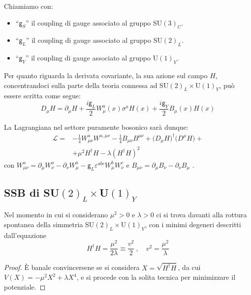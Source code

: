 \documentclass[../main.tex]{subfiles}
\begin{document}
Chiamiamo con:
\begin{itemize}
    \item “$\mathsf g_S$” il coupling di gauge associato al gruppo SU$(3)_C$.
    \item “$\mathsf g_L$” il coupling di gauge associato al gruppo SU$(2)_L$.
    \item “$\mathsf g_Y$” il coupling di gauge associato al gruppo U$(1)_Y$.
\end{itemize}

Per quanto riguarda la derivata covariante, la sua azione sul campo $H$, concentrandoci sulla parte della teoria connessa ad SU$(2)_L\times$U$(1)_Y$, può essere scritta come segue:
\begin{equation}
    \boxed{D_\mu H = \partial_\mu H +\frac{i\mathsf g_L}{2}W_\mu^a(x)\sigma^a H(x) +\frac{i\mathsf g_Y}{2} B_\mu(x) H(x)}
    \label{eq:higgs_doubl_covariant_derivative}
\end{equation}

La Lagrangiana nel settore puramente bosonico sarà dunque:
\begin{equation}
    \boxed{
    \begin{aligned}
        \mathscr{L} =& -\frac{1}{4}W_{\mu\nu}^a W^{a,\mu\nu}-\frac{1}{4}B_{\mu\nu} B^{\mu\nu} + \big(D_\mu H\big)^\dagger \big(D^\mu H\big) +\\
        &+ \mu^2 H^\dagger H - \lambda (H^\dagger H)^2
    \end{aligned}
    }
    \label{eq:pure_bosonic_lagrangian}
\end{equation}
con $W_{\mu\nu}^a = \partial_\mu W_\nu^a - \partial_\nu W_\mu^a - \mathsf g_L \varepsilon^{abc}W_\mu^b W_\nu^c$ e $B_{\mu\nu} = \partial_\mu B_\nu - \partial_\nu B_\mu$ .
 
\subsection{SSB di SU$(2)_L\times$U$(1)_Y$}

Nel momento in cui si considerano $\mu^2>0$ e $\lambda>0$ ci si trova davanti alla rottura spontanea della simmetria SU$(2)_L\times$U$(1)_Y$, con i minimi degeneri descritti dall'equazione 
\begin{equation}
    \boxed{H^\dagger H = \frac{\mu^2}{2\lambda} \equiv \frac{v^2}{2} ~,\quad v^2=\frac{\mu^2}{\lambda}}
    \label{eq:minimum_condition_SM_bosonic}
\end{equation}
\begin{proof}
    È banale convincersene se si considera $X=\sqrt{H^\dagger H}$, da cui $V(X) = -\mu^2X^2 +\lambda X^4$, e si procede con la solita tecnica per minimizzare il potenziale.
\end{proof}
\end{document}

